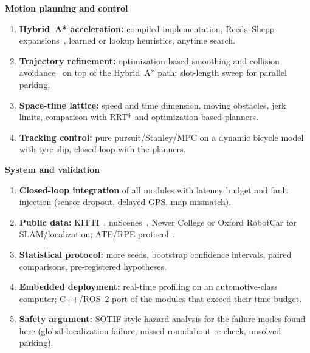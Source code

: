 \documentclass[11pt,a4paper]{article}
\begin{document}
\textbf{Motion planning and control}
\begin{enumerate}[resume*=ideas]
\item \textbf{Hybrid~A* acceleration:} compiled implementation, Reeds--Shepp expansions~\cite{reeds90}, learned or lookup heuristics, anytime search.
\item \textbf{Trajectory refinement:} optimization-based smoothing and collision avoidance~\cite{zhang21} on top of the Hybrid~A* path; slot-length sweep for parallel parking.
\item \textbf{Space-time lattice:} speed and time dimension, moving obstacles, jerk limits, comparison with RRT* and optimization-based planners.
\item \textbf{Tracking control:} pure pursuit/Stanley/MPC on a dynamic bicycle model with tyre slip, closed-loop with the planners.
\end{enumerate}
\textbf{System and validation}
\begin{enumerate}[resume*=ideas]
\item \textbf{Closed-loop integration} of all modules with latency budget and fault injection (sensor dropout, delayed GPS, map mismatch).
\item \textbf{Public data:} KITTI~\cite{geiger12}, nuScenes~\cite{caesar20}, Newer College or Oxford RobotCar for SLAM/localization; ATE/RPE protocol~\cite{zhang18}.
\item \textbf{Statistical protocol:} more seeds, bootstrap confidence intervals, paired comparisons, pre-registered hypotheses.
\item \textbf{Embedded deployment:} real-time profiling on an automotive-class computer; C++/ROS~2 port of the modules that exceed their time budget.
\item \textbf{Safety argument:} SOTIF-style hazard analysis for the failure modes found here (global-localization failure, missed roundabout re-check, unsolved parking).
\end{enumerate}
\end{document}
